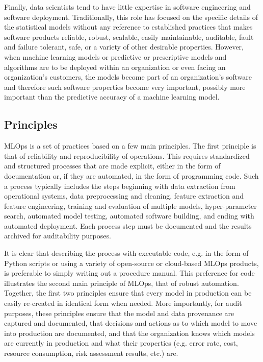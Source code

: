 Finally, data scientists tend to have little expertise in software engineering and software deployment. Traditionally, this role has focused on the specific details of the statistical models without any reference to established practices that makes software products reliable, robust, scalable, easily maintainable, auditable, fault and failure tolerant, safe, or a variety of other desirable properties. However, when machine learning models or predictive or prescriptive models and algorithms are to be deployed within an organization or even facing an organization's customers, the models become part of an organization's software and therefore such software properties become very important, possibly more important than the predictive accuracy of a machine learning model. 

\subsection*{Principles}

MLOps is a set of practices based on a few main principles. The first principle is that of reliability and reproducibility of operations. This requires standardized and structured processes that are made explicit, either in the form of documentation or, if they are automated, in the form of programming code. Such a process typically includes the steps beginning with data extraction from operational systems, data preprocessing and cleaning, feature extraction and feature engineering, training and evaluation of multiple models, hyper-parameter search, automated model testing, automated software building, and ending with automated deployment. Each process step must be documented and the results archived for auditability purposes. 

It is clear that describing the process with executable code, e.g. in the form of Python scripts or using a variety of open-source or cloud-based MLOps products, is preferable to simply writing out a procedure manual. This preference for code illustrates the second main principle of MLOps, that of robust automation. Together, the first two principles ensure that every model in production can be easily re-created in identical form when needed. More importantly, for audit purposes, these principles ensure that the model and data provenance are captured and documented, that decisions and actions as to which model to move into production are documented, and that the organization knows which models are currently in production and what their properties (e.g. error rate, cost, resource consumption, risk assessment results, etc.) are.

